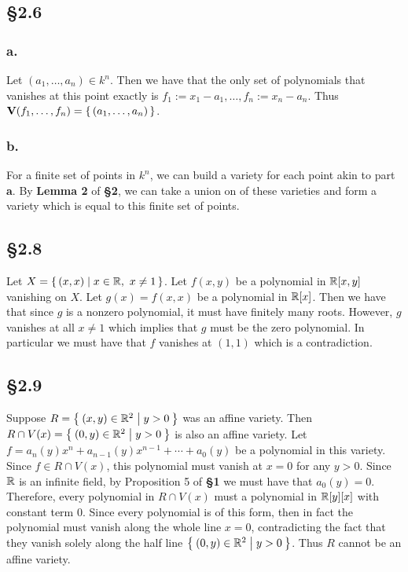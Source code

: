 \documentclass[letterpaper]{article}
\begin{document}
\subsection*{\S 2.6}

\subsubsection*{a.}

Let $(a_{1}, \ldots, a_{n}) \in k^{n}$. Then we have that the only set of polynomials that vanishes at this point exactly is $f_{1} := x_{1} - a_{1}, \ldots, f_{n} := x_{n} - a_{n}$. Thus $\textbf{V}(f_{1}, \ldots, f_{n}) = \set{(a_{1}, \ldots, a_{n})}$.

\subsubsection*{b.}

For a finite set of points in $k^{n}$, we can build a variety for each point akin to part \textbf{a}. By \textbf{Lemma 2} of \textbf{\S 2}, we can take a union on of these varieties and form a variety which is equal to this finite set of points.

\subsection*{\S 2.8}

Let $X = \set{(x, x) | x \in \mathbb{R},~ x \neq 1}$. Let $f(x, y)$ be a polynomial in $\mathbb{R}[x, y]$ vanishing on $X$. Let $g(x) = f(x, x)$ be a polynomial in $\mathbb{R}[x]$. Then we have that since $g$ is a nonzero polynomial, it must have finitely many roots. However, $g$ vanishes at all $x \neq 1$ which implies that $g$ must be the zero polynomial. In particular we must have that $f$ vanishes at $(1, 1)$ which is a contradiction.

\clearpage

\subsection*{\S 2.9}

Suppose $R = \Set{(x, y) \in \mathbb{R}^{2} | y > 0}$ was an affine variety.
Then $R \cap V(x) = \Set{(0, y) \in \mathbb{R}^{2} | y > 0}$ is also an affine variety.
Let $f = a_{n}(y)x^{n} + a_{n - 1}(y)x^{n - 1} + \cdots + a_{0}(y)$ be a polynomial in this variety.
Since $f \in R \cap V(x)$, this polynomial must vanish at $x = 0$ for any $y > 0$.
Since $\mathbb{R}$ is an infinite field, by Proposition 5 of \textbf{\S 1} we must have that $a_{0}(y) = 0$.
Therefore, every polynomial in $R \cap V(x)$ must a polynomial in $\mathbb{R}[y][x]$ with constant term $0$.
Since every polynomial is of this form, then in fact the polynomial must vanish along the whole line $x = 0$, contradicting the fact that they vanish solely along the half line $\Set{(0, y) \in \mathbb{R}^{2} | y > 0}$.
Thus $R$ cannot be an affine variety.
\end{document}
